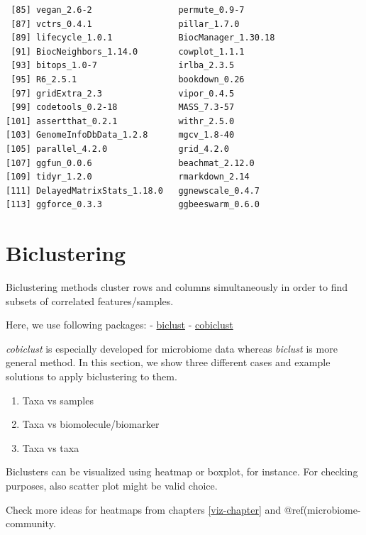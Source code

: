 \documentclass[
]{book}
\providecommand{\tightlist}{%
  \setlength{\itemsep}{0pt}\setlength{\parskip}{0pt}}
\begin{document}
\begin{verbatim}
 [85] vegan_2.6-2                 permute_0.9-7              
 [87] vctrs_0.4.1                 pillar_1.7.0               
 [89] lifecycle_1.0.1             BiocManager_1.30.18        
 [91] BiocNeighbors_1.14.0        cowplot_1.1.1              
 [93] bitops_1.0-7                irlba_2.3.5                
 [95] R6_2.5.1                    bookdown_0.26              
 [97] gridExtra_2.3               vipor_0.4.5                
 [99] codetools_0.2-18            MASS_7.3-57                
[101] assertthat_0.2.1            withr_2.5.0                
[103] GenomeInfoDbData_1.2.8      mgcv_1.8-40                
[105] parallel_4.2.0              grid_4.2.0                 
[107] ggfun_0.0.6                 beachmat_2.12.0            
[109] tidyr_1.2.0                 rmarkdown_2.14             
[111] DelayedMatrixStats_1.18.0   ggnewscale_0.4.7           
[113] ggforce_0.3.3               ggbeeswarm_0.6.0           
\end{verbatim}

\hypertarget{biclustering}{%
\chapter{Biclustering}\label{biclustering}}

Biclustering methods cluster rows and columns simultaneously in order
to find subsets of correlated features/samples.

Here, we use following packages:
- \href{https://cran.r-project.org/web/packages/biclust/index.html}{biclust}
- \href{https://besjournals.onlinelibrary.wiley.com/doi/abs/10.1111/2041-210X.13582}{cobiclust}

\emph{cobiclust} is especially developed for microbiome data whereas \emph{biclust} is more
general method. In this section, we show three different cases and example
solutions to apply biclustering to them.

\begin{enumerate}
\def\labelenumi{\arabic{enumi}.}
\tightlist
\item
  Taxa vs samples
\item
  Taxa vs biomolecule/biomarker
\item
  Taxa vs taxa
\end{enumerate}

Biclusters can be visualized using heatmap or boxplot, for instance. For checking purposes,
also scatter plot might be valid choice.

Check more ideas for heatmaps from chapters \ref{viz-chapter} and @ref(microbiome-community.
\end{document}
